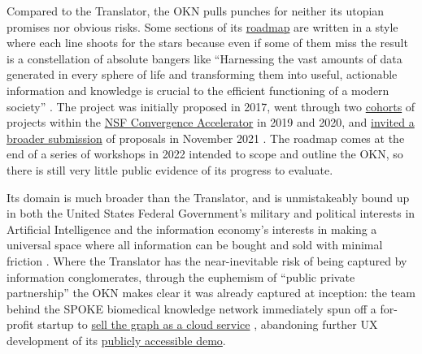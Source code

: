 Compared to the Translator, the OKN pulls punches for neither its
utopian promises nor obvious risks. Some sections of its
\href{https://web.archive.org/web/20221028095757/https://nsf-gov-resources.nsf.gov/2022-09/OKN\%20Roadmap\%20-\%20Report_v03.pdf}{roadmap}
are written in a style where each line shoots for the stars because even
if some of them miss the result is a constellation of absolute bangers
like ``Harnessing the vast amounts of data generated in every sphere of
life and transforming them into useful, actionable information and
knowledge is crucial to the efficient functioning of a modern
society'' \cite{baruOpenKnowledgeNetwork2022} . The project was initially proposed in 2017, went through two
\href{https://beta.nsf.gov/funding/initiatives/convergence-accelerator/portfolio}{cohorts}
of projects within the
\href{https://beta.nsf.gov/funding/initiatives/convergence-accelerator/portfolio}{NSF
Convergence Accelerator} in 2019 and 2020, and
\href{https://www.nsf.gov/pubs/2022/nsf22017/nsf22017.jsp}{invited a
broader submission} of proposals in November 2021 \cite{nationalsciencefoundationNSF22017Dear2021} . The roadmap comes at the
end of a series of workshops in 2022 intended to scope and outline the
OKN, so there is still very little public evidence of its progress to
evaluate.

Its domain is much broader than the Translator, and is unmistakeably
bound up in both the United States Federal Government's military and
political interests in Artificial Intelligence \cite{nationalsecuritycommissiononartificialintelligenceFinalReport2021} 
and the information economy's interests in making a universal space
where all information can be bought and sold with minimal friction \cite{bigdatainteragencyworkinggroupOpenKnowledgeNetwork2018} . Where
the Translator has the near-inevitable risk of being captured by
information conglomerates, through the euphemism of ``public private
partnership'' the OKN makes clear it was already captured at inception:
the team behind the SPOKE biomedical knowledge network immediately spun
off a for-profit startup to
\href{https://www.matebioservices.com/spoke-cloud}{sell the graph as a
cloud service} \cite{matebioservicesinc.SPOKECloud2021} ,
abandoning further UX development of its
\href{https://spoke.rbvi.ucsf.edu/}{publicly accessible demo}.

